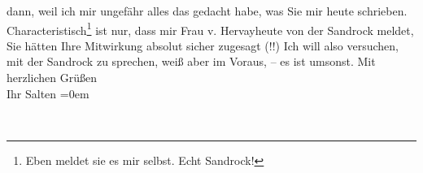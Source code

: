 \begin{ledgroupsized}[t]{13cm}
               dann, weil ich mir ungefähr alles das gedacht habe, was Sie mir heute schrieben.\pend
           \pstart
           Characteristisch\footnote{\noindent{}Eben meldet sie es mir selbst. Echt Sandrock!} ist nur, dass mir Frau v. Hervayheute von der Sandrock meldet, Sie hätten Ihre Mitwirkung absolut sicher zugesagt (!!) Ich
               will also versuchen, mit der Sandrock zu
               sprechen, weiß aber im Voraus, – es ist umsonst.\pend
           \pstart
           Mit herzlichen Grüßen{\\[\baselineskip]}Ihr \spacefill\mbox{Salten}\pend
           \leftskip=0em{}
         
         \endnumbering{}\end{ledgroupsized}  \newcommand{\dateiname}{L03405}\newcommand{\titel}{Felix Salten an Arthur Schnitzler, 11. 1. 1905}\newcommand{\editorInnen}{Martin Anton Müller und Laura Untner}
      